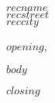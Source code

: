\documentclass[a4paper,10pt]{scrlttr2}
\begin{document}
\begin{letter}{$recname$\\$recstreet$\\$reccity$}
\opening{$opening$,}

$body$

\closing{$closing$}


\end{letter}
\end{document}
